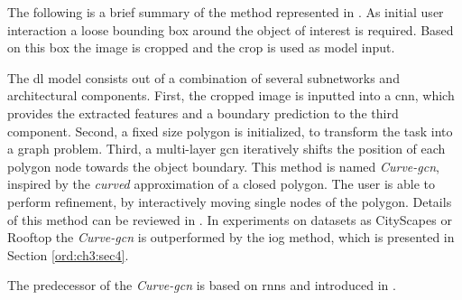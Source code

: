 The following is a brief summary of the method represented in \cite{Ling19-Curve-GCN}.
As initial user interaction a loose bounding box around the object of interest is required.
Based on this box the image is cropped and the crop is used as model input.

The \gls{dl} model consists out of a combination of several subnetworks and architectural components.
First, the cropped image is inputted into a \gls{cnn}, which provides the extracted features and a boundary prediction to the third component.
Second, a fixed size polygon is initialized, to transform the task into a graph problem.
Third, a multi-layer \gls{gcn} iteratively shifts the position of each polygon node towards the object boundary. 
This method is named \textit{Curve-\gls{gcn}}, inspired by the \textit{curved} approximation of a closed polygon.
The user is able to perform refinement, by interactively moving single nodes of the polygon.
Details of this method can be reviewed in \cite{Ling19-Curve-GCN}.
In experiments on datasets as CityScapes or Rooftop the \textit{Curve-\gls{gcn}} is outperformed by the \gls{iog} method, which is presented in Section \ref{ord:ch3:sec4}.

The predecessor of the \textit{Curve-\gls{gcn}} is based on \glspl{rnn} and introduced in \cite{Acu18-Polygon-RNN++}.





